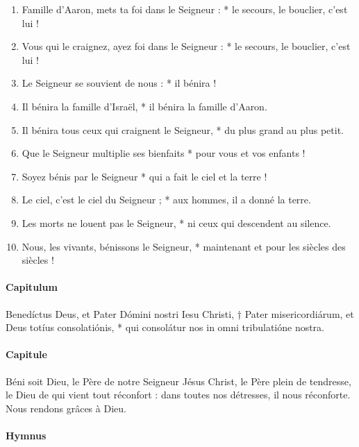 \documentclass[twoside]{article}
\begin{document}
\begin{paracol}[1]{2}
\begin{enumerate}[wide, itemsep=0mm, labelwidth=!, labelindent=0pt, label=\color{gregoriocolor}\theenumi]
\item Famille d'Aaron, mets ta foi dans le Seigneur : * le secours, le bouclier, c'est lui !
\item Vous qui le craignez, ayez foi dans le Seigneur : * le secours, le bouclier, c'est lui !
\item Le Seigneur se souvient de nous : * il bénira ! 
\item Il bénira la famille d'Israël, * il bénira la famille d'Aaron.
\item Il bénira tous ceux qui craignent le Seigneur, * du plus grand au plus petit.
\item Que le Seigneur multiplie ses bienfaits * pour vous et vos enfants !
\item Soyez bénis par le Seigneur * qui a fait le ciel et la terre !
\item Le ciel, c'est le ciel du Seigneur ; * aux hommes, il a donné la terre.
\item Les morts ne louent pas le Seigneur, * ni ceux qui descendent au silence.
\item Nous, les vivants, bénissons le Seigneur, * maintenant et pour les siècles des siècles !

\end{enumerate}
\switchcolumn*

\paragraph{Capitulum}
Benedíctus Deus, et Pater Dómini nostri Iesu Christi, † Pater misericordiárum, et Deus totíus consolatiónis, * qui consolátur nos in omni tribulatióne nostra.


\switchcolumn

\paragraph{Capitule}
 \capsaut Béni soit Dieu, le Père de notre Seigneur Jésus Christ, le Père plein de tendresse, le Dieu de qui vient tout réconfort : dans toutes nos détresses, il nous réconforte.\\
\rr Nous rendons grâces à Dieu.

\switchcolumn*

\paragraph{Hymnus}


\end{paracol}
\end{document}
